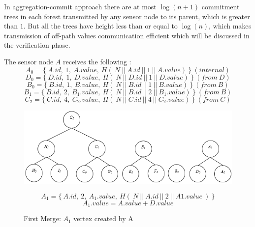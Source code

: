 		In aggregation-commit approach there are at most $\log(n+1)$ commitment trees in each forest transmitted by any sensor node to its parent, which is greater than $1$.
		But all the trees have height less than or equal to $\log(n)$, which makes transmission of off-path values communication efficient which will be discussed in the verification phase.


	The sensor node $A$ receives the following \payloads:
		\begin{equation}
			A_{0} = \{\ A.id,\ 1,\ A.value,\ H  (\ N\ ||\ A.id\ ||\ 1\ ||\ A.value)\ \}\ (internal)
		\end{equation}
		\begin{equation}
			D_{0} = \{\ D.id,\ 1,\ D.value,\ H(\ N\ ||\ D.id\ ||\ 1\ ||\ D.value)\ \}\ (from\ D)
		\end{equation}
		\begin{equation}
			B_{0} = \{\ B.id,\ 1,\ B.value,\ H(\ N\ ||\ B.id\ ||\ 1\ ||\ B.value)\ \}\ (from\ B)
		\end{equation}
		\begin{equation}
			B_{1} = \{\ B.id,\ 2,\ B_{1}.value,\ H(\ N\ ||\ B.id\ ||\ 2\ ||\ B_{1}.value)\ \}\ (from\ B)
		\end{equation}
		\begin{equation}
			C_{2} = \{\ C.id,\ 4,\ C_{2}.value,\ H(\ N\ ||\ C.id\ ||\ 4\ ||\ C_{2}.value)\ \}\ (from\ C)
		\end{equation}

	\begin{figure}[hp]
		\centering
		\includegraphics[scale = 0.7]{images/commitment-tree-example-2.png}\\
		\caption{First Merge: $A_{1}$ vertex created by A}
		\label{fig:commitment-tree-example-2}
		\begin{equation}
			A_{1} = \{\ A.id,\ 2,\ A_{1}.value,\ H(\ N\ ||\ A.id\ ||\ 2\ ||\ A{1}.value\ )\ \}
		\end{equation}
		\begin{equation}
			A_{1}.value = A.value + D.value
		\end{equation}
	\end{figure}

